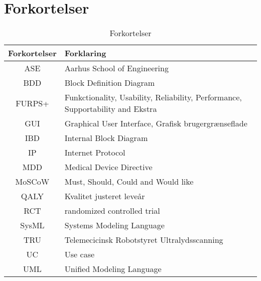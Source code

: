 \chapter{Forkortelser}

\begin{table}[htb]
\centering
\begin{tabular}{ | c | p{} | }
\hline
\textbf{Forkortelser} & \textbf{Forklaring} \\\hline
ASE & Aarhus School of Engineering \\\hline
BDD & Block Definition Diagram \\\hline
FURPS+ & Funkctionality, Usability, Reliability, Performance, Supportability and Ekstra \\\hline
GUI & Graphical User Interface, Grafisk brugergrænseflade \\\hline
IBD & Internal Block Diagram \\\hline
IP & Internet Protocol \\\hline
MDD & Medical Device Directive \\\hline
MoSCoW & Must, Should, Could and Would like \\\hline
QALY & Kvalitet justeret leveår  \\\hline
RCT & randomized controlled trial \\\hline
SysML & Systems Modeling Language \\\hline
TRU & Telemecicinsk Robotstyret Ultralydsscanning \\\hline
UC & Use case \\\hline
UML & Unified Modeling Language \\\hline

\end{tabular}
\caption{Forkortelser}
\end{table}

\vspace{3cm}
